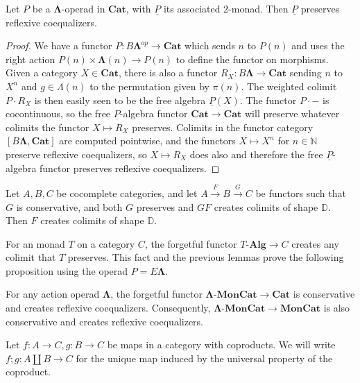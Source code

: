 \documentclass{amsbook} %
\newcommand{\mb}{\mathbf}
\newcommand{\und}[1]{\ensuremath{\underline{#1}}}
\newcommand{\ML}{\mathbf{\Lambda}}
\newcommand{\moncat}{\ensuremath{\mb{MonCat}}}
\newcommand{\cat}{\ensuremath{\mb{Cat}}}
\newcommand{\Alg}{\mbox{-}\mb{Alg}}
\numberwithin{section}{chapter}
\begin{document}
\begin{lem}\label{P_pres_refl}
Let $P$ be a $\ML$-operad in $\cat$, with $\und{P}$ its associated 2-monad. Then $\und{P}$ preserves reflexive coequalizers.

\end{lem}
\begin{proof}
We have a functor $P \colon B\ML^{op} \to \cat$ which sends $n$ to $P(n)$ and uses the right action $P(n) \times \ML(n) \to P(n)$ to define the functor on morphisms. Given a category $X \in \cat$, there is also a functor $R_X \colon B\ML \to \cat$ sending $n$ to $X^n$ and $g \in \Lambda(n)$ to the permutation given by $\pi(n)$. The weighted colimit $P \cdot R_X$ is then easily seen to be the free algebra $\und{P}(X)$. The functor $P \cdot -$ is cocontinuous, so the free $\und{P}$-algebra functor $\cat \to \cat$ will preserve whatever colimits the functor $X \mapsto R_X$ preserves. Colimits in the functor category $[B\ML, \cat]$ are computed pointwise, and the functors $X \mapsto X^n$ for $n \in \mathbb{N}$ preserve reflexive coequalizers, so $X \mapsto R_X$ does also and therefore the free $\und{P}$-algebra functor preserves reflexive coequalizers.
\end{proof}

\begin{lem}\label{creation_triangle}
Let $A,B,C$ be cocomplete categories, and let $A \stackrel{F}{\to} B \stackrel{G}{\to} C$ be functors such that $G$ is conservative, and both $G$ preserves and $GF$ creates colimits of shape $\mathbb{D}$. Then $F$ creates colimits of shape $\mathbb{D}$.
\end{lem}

For an monad $T$ on a category $C$, the forgetful functor $T\Alg \to C$ creates any colimit that $T$ preserves. This fact and the previous lemmas prove the following proposition using the operad $P = E\ML$.
\begin{prop}\label{refcoeq_calcs}
For any action operad $\ML$, the forgetful functor $\ML\mbox{-}\moncat \to \cat$ is conservative and creates reflexive coequalizers. Consequently, $\ML\mbox{-}\moncat \to \moncat$ is also conservative and creates reflexive coequalizers.

\end{prop}

\begin{nota}\label{plus_notation}
Let $f \colon  A \to C, g \colon  B \to C$ be maps in a category with coproducts. We will write $f;g \colon  A \coprod B \to C$ for the unique map induced by the universal property of the coproduct.
\end{nota}
\end{document}
